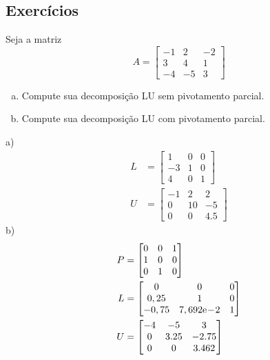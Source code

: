 \subsection{Exercícios}

\begin{exer}
  Seja a matriz
  \begin{equation}
    A =
    \begin{bmatrix}
      -1 & 2 & -2\\
      3 & 4 & 1\\
      -4 & -5 & 3
    \end{bmatrix}
  \end{equation}
  \begin{enumerate}[a)]
  \item Compute sua decomposição LU sem pivotamento parcial.
  \item Compute sua decomposição LU com pivotamento parcial.
  \end{enumerate}
\end{exer}
\begin{resp}
  a)
  \begin{align}
    L &=
        \begin{bmatrix}
          1 & 0 & 0\\
          -3 & 1 & 0\\
          4 & 0 & 1
        \end{bmatrix}\\
    U &=
        \begin{bmatrix}
          -1 & 2 & 2\\
          0 & 10 & -5\\
          0 & 0 & 4.5
        \end{bmatrix}
  \end{align}
  b)
  \begin{align}
    P &=
        \begin{bmatrix}
          0 & 0 & 1\\
          1 & 0 & 0\\
          0 & 1 & 0
        \end{bmatrix}\\
    L &=
        \begin{bmatrix}
              0  & 0 & 0\\
           0,25  & 1 & 0\\
          -0,75  & 7,692\mathrm{e}\!-\!2 & 1
        \end{bmatrix}\\
    U &=
        \begin{bmatrix}
          -4 & -5 & 3\\
          0 & 3.25 & -2.75\\
          0 & 0 & 3.462
        \end{bmatrix}
  \end{align}  
\end{resp}

